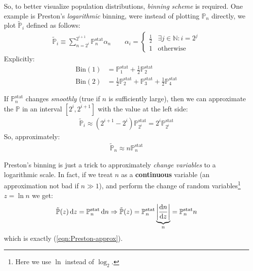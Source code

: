 \documentclass[../../main.tex]{subfiles}
\begin{document}
So, to better visualize population distributions, \textit{binning scheme} is required. One example is Preston's \textit{logarithmic} binning, were instead of plotting $\mathbb{P}_n$ directly, we plot $\tilde{\mathbb{P}}_i$ defined as follows:
\begin{align*}
    \tilde{\mathbb{P}}_i \equiv \sum_{n=2^i}^{2^{i+1}} \mathbb{P}_{n}^{\mathrm{stat}} \alpha_n \qquad \alpha_i = \begin{cases}
        \frac{1}{2} & \exists j \in \mathbb{N} \colon i = 2^j\\
        1 & \text{otherwise}
    \end{cases}
\end{align*}
Explicitly:
\begin{align*}
    \mathrm{Bin}(1) &= \mathbb{P}_{1}^{\mathrm{stat}} + \frac{1}{2} \mathbb{P}_2^{\mathrm{stat}} \\
    \mathrm{Bin}(2) &= \frac{1}{2} \mathbb{P}_2^{\mathrm{stat}} + \mathbb{P}_3^{\mathrm{stat}} + \frac{1}{2} \mathbb{P}_4^{\mathrm{stat}}  
\end{align*}

If $\mathbb{P}_n^{\mathrm{stat}}$ changes \textit{smoothly} (true if $n$ is sufficiently large), then we can approximate the $\mathbb{P}$ in an interval $[2^i, 2^{i+1}]$ with the value at the left side:
\begin{align*}
    \tilde{\mathbb{P}}_i \approx (2^{i+1} - 2^{i}) \mathbb{P}_{2^i}^{\mathrm{stat}} = 2^i \mathbb{P}_{2^i}^{\mathrm{stat}}
\end{align*}
So, approximately:
\begin{align}\label{eqn:Preston-approx}
    \tilde{\mathbb{P}}_n \approx n \mathbb{P}_n^{\mathrm{stat}}
\end{align}

Preston's binning is just a trick to approximately \textit{change variables} to a logarithmic scale. In fact, if we treat $n$ as a \textbf{continuous} variable (an approximation not bad if $n \gg 1$), and perform the change of random variables\footnote{Here we use $\ln$ instead of $\log_2$.} $z = \ln n$ we get:
\begin{align}\label{eqn:logscalebin}
    \tilde{\mathbb{P}}(z) \dd{z} = \mathbb{P}_n^{\mathrm{stat}}\dd{n} \Rightarrow \tilde{\mathbb{P}}(z) = \mathbb{P}_n^{\mathrm{stat}} \underbrace{\left|\dv{n}{z}\right|}_{n}  = \mathbb{P}_n^{\mathrm{stat}}n
\end{align}
which is exactly (\ref{eqn:Preston-approx}).

\medskip
\end{document}
